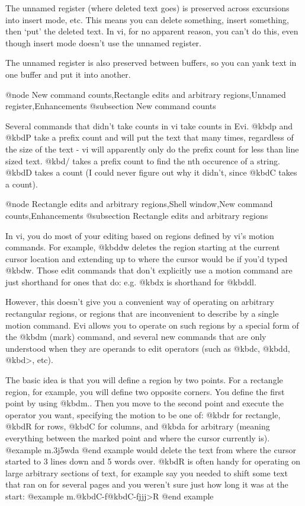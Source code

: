 {The unnamed register (where deleted text goes) is preserved across
excursions into insert mode, etc.  This means you can delete something,
insert something, then `put' the deleted text.  In vi, for no apparent
reason, you can't do this, even though insert mode doesn't use the
unnamed register.

The unnamed register is also preserved between buffers, so you can yank
text in one buffer and put it into another.

@node New command counts,Rectangle edits and arbitrary regions,Unnamed register,Enhancements
@subsection New command counts

Several commands that didn't take counts in vi take counts in Evi.  @kbd{p}
and @kbd{P} take a prefix count and will put the text that many times,
regardless of the size of the text - vi will apparently only do the
prefix count for less than line sized text.  @kbd{/} takes a prefix count to
find the nth occurence of a string.  @kbd{D} takes a count (I could never
figure out why it didn't, since @kbd{C} takes a count).

@node Rectangle edits and arbitrary regions,Shell window,New command counts,Enhancements
@subsection Rectangle edits and arbitrary regions

In vi, you do most of your editing based on regions defined by vi's motion
commands.  For example, @kbd{dw} deletes the region starting at the current
cursor location and extending up to where the cursor would be if you'd typed
@kbd{w}.  Those edit commands that don't explicitly use a motion command are
just shorthand for ones that do: e.g. @kbd{x} is shorthand for @kbd{dl}.

However, this doesn't give you a convenient way of operating on arbitrary
rectangular regions, or regions that are inconvenient to describe by a
single motion command.  Evi allows you to operate on such regions by a
special form of the @kbd{m} (mark) command, and several new commands that
are only understood when they are operands to edit operators (such as @kbd{c},
@kbd{d}, @kbd{>}, etc).

The basic idea is that you will define a region by two points.  For a rectangle
region, for example, you will define two opposite corners.  You define the
first point by using @kbd{m.}.  Then you move to the second point and
execute the operator you want, specifying the motion to be one of: @kbd{r} for
rectangle, @kbd{R} for rows, @kbd{C} for columns, and @kbd{a} for arbitrary
(meaning everything between the marked point and where the cursor currently
is).
@example
m.3j5wda
@end example
would delete the text from where the cursor started to 3 lines down and
5 words over.  @kbd{R} is often handy for operating on large arbitrary
sections of text, for example say you needed to shift some text that ran
on for several pages and you weren't sure just how long it was at the
start:
@example
m.@kbd{C-f}@kbd{C-f}jjj>R
@end example

}
